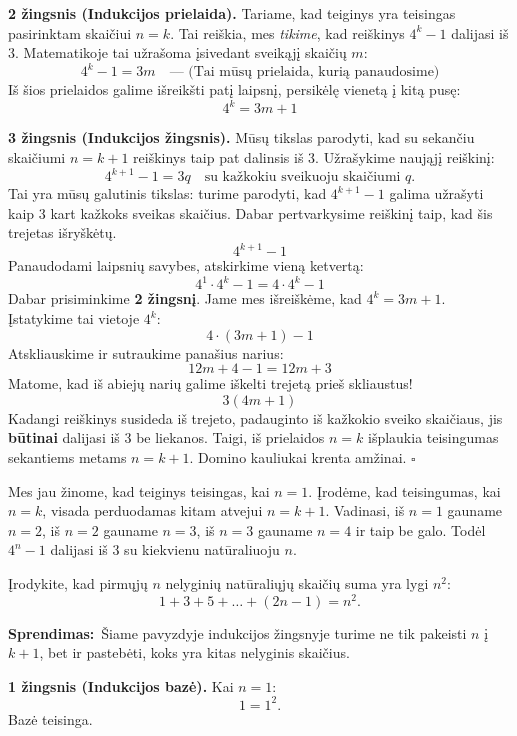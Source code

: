 \documentclass[11pt,a4paper]{scrartcl}
\begin{document}
\textbf{2 žingsnis (Indukcijos prielaida).} Tariame, kad teiginys yra teisingas pasirinktam skaičiui $n = k$. Tai reiškia, mes \textit{tikime}, kad reiškinys $4^k - 1$ dalijasi iš 3. Matematikoje tai užrašoma įsivedant sveikąjį skaičių $m$:
$$
4^k - 1 = 3m \quad \text{--- (Tai mūsų prielaida, kurią panaudosime)}
$$
Iš šios prielaidos galime išreikšti patį laipsnį, persikėlę vienetą į kitą pusę:
$$
4^k = 3m + 1
$$

\textbf{3 žingsnis (Indukcijos žingsnis).} Mūsų tikslas parodyti, kad su sekančiu skaičiumi $n = k+1$ reiškinys taip pat dalinsis iš 3. Užrašykime naująjį reiškinį:
\begin{equation}
4^{k+1}-1 = 3q \quad \text{su kažkokiu sveikuoju skaičiumi } q.
\end{equation}
Tai yra mūsų galutinis tikslas: turime parodyti, kad $4^{k+1}-1$ galima užrašyti kaip 3 kart kažkoks sveikas skaičius. Dabar pertvarkysime reiškinį taip, kad šis trejetas išryškėtų.
$$
4^{k+1} - 1
$$
Panaudodami laipsnių savybes, atskirkime vieną ketvertą:
$$
4^1 \cdot 4^k - 1 = 4 \cdot 4^k - 1
$$
Dabar prisiminkime \textbf{2 žingsnį}. Jame mes išreiškėme, kad $4^k = 3m + 1$. Įstatykime tai vietoje $4^k$:
$$
4 \cdot (3m + 1) - 1
$$
Atskliauskime ir sutraukime panašius narius:
$$
12m + 4 - 1 = 12m + 3
$$
Matome, kad iš abiejų narių galime iškelti trejetą prieš skliaustus!
$$
3(4m + 1)
$$
Kadangi reiškinys susideda iš trejeto, padauginto iš kažkokio sveiko skaičiaus, jis \textbf{būtinai} dalijasi iš 3 be liekanos. Taigi, iš prielaidos $n=k$ išplaukia teisingumas sekantiems metams $n=k+1$. Domino kauliukai krenta amžinai. \hfill $\square$

Mes jau žinome, kad teiginys teisingas, kai $n=1$. Įrodėme, kad teisingumas, kai $n=k$, visada perduodamas kitam atvejui $n=k+1$. Vadinasi, iš $n=1$ gauname $n=2$, iš $n=2$ gauname $n=3$, iš $n=3$ gauname $n=4$ ir taip be galo. Todėl $4^n-1$ dalijasi iš 3 su kiekvienu natūraliuoju $n$.

\begin{example}
Įrodykite, kad pirmųjų $n$ nelyginių natūraliųjų skaičių suma yra lygi $n^2$:
$$
1+3+5+\dots+(2n-1)=n^2.
$$
\end{example}

\textbf{Sprendimas:}\
Šiame pavyzdyje indukcijos žingsnyje turime ne tik pakeisti $n$ į $k+1$, bet ir pastebėti, koks yra kitas nelyginis skaičius.

\textbf{1 žingsnis (Indukcijos bazė).} Kai $n=1$:
$$
1=1^2.
$$
Bazė teisinga.
\end{document}
